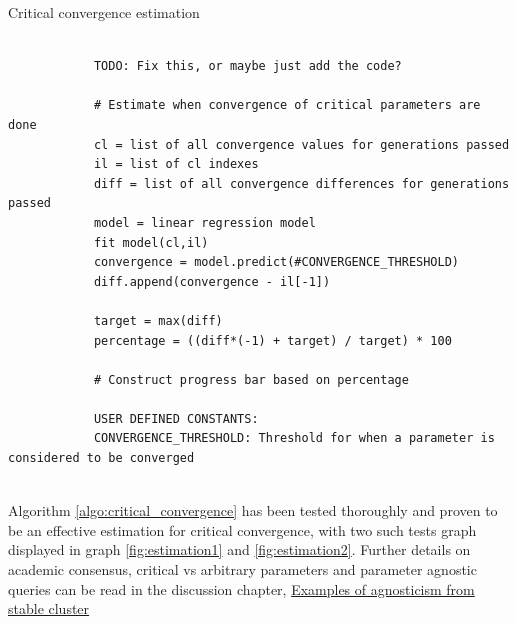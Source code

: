 \documentclass[a4paper,english]{report}
\begin{document}
		\begin{algorithm}
			\caption{Critical convergence estimation}\label{algo:critical_convergence}
			\scriptsize
			\begin{verbatim}
			
			TODO: Fix this, or maybe just add the code?
			
			# Estimate when convergence of critical parameters are done
			cl = list of all convergence values for generations passed
			il = list of cl indexes
			diff = list of all convergence differences for generations passed
			model = linear regression model
			fit model(cl,il)
			convergence = model.predict(#CONVERGENCE_THRESHOLD)
			diff.append(convergence - il[-1])
			
			target = max(diff)
			percentage = ((diff*(-1) + target) / target) * 100
			
			# Construct progress bar based on percentage
			
			USER DEFINED CONSTANTS:
			CONVERGENCE_THRESHOLD: Threshold for when a parameter is considered to be converged
			
			\end{verbatim}
		\end{algorithm}
		\clearpage
		Algorithm \ref{algo:critical_convergence} has been tested thoroughly and proven to be an effective estimation for critical convergence, with two such tests graph displayed in graph \ref{fig:estimation1} and \ref{fig:estimation2}. Further details on academic consensus, critical vs arbitrary parameters and parameter agnostic queries can be read in the discussion chapter, \hyperref[sec:param_agno]{Examples of agnosticism from stable cluster}
\end{document}
